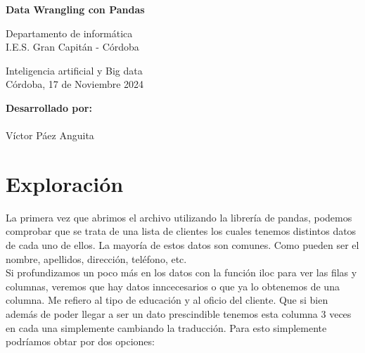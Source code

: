 \documentclass[12pt]{article}
\begin{document}
\begin{titlepage}
    \begin{center}
      \Large \bfseries{}
    \end{center}
    \vspace{0.1cm}
    \begin{center}
      \Large \bfseries{}
    \end{center}
    \vspace{0.1cm}
    \begin{center}
     \Large \bfseries{Data Wrangling con Pandas}
    \end{center}
    \vspace{0.0001cm}
    \begin{center}
        Departamento de informática \\ I.E.S. Gran Capitán - Córdoba
    \end{center}
        \vspace{2 cm}
    \vspace{0.2 cm}
    \begin{center}
        Inteligencia artificial y Big data \\ Córdoba, 17 de Noviembre 2024
    \end{center}
    \vspace{12 cm}
\null\hfill \textbf{Desarrollado por:}
\\
\\
\null\hfill Víctor Páez Anguita
\clearpage
\end{titlepage}

\tableofcontents
\clearpage

\section{Exploración}

La primera vez que abrimos el archivo utilizando la librería de pandas, podemos comprobar que se trata de una lista de clientes
los cuales tenemos distintos datos de cada uno de ellos. La mayoría de estos datos son comunes. Como pueden ser el nombre,
apellidos, dirección, teléfono, etc.
\\
Si profundizamos un poco más en los datos con la función iloc para ver las filas y columnas, veremos que hay datos inncecesarios
o que ya lo obtenemos de una columna. Me refiero al tipo de educación y al oficio del cliente. Que si bien además de poder 
llegar a ser un dato prescindible tenemos esta columna 3 veces en cada una simplemente cambiando la traducción. Para esto
simplemente podríamos obtar por dos opciones:
\end{document}
